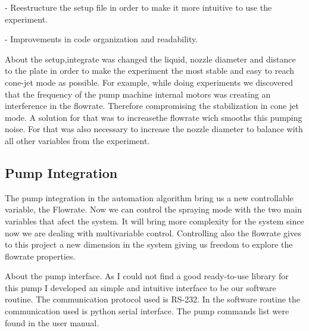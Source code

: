 - Reestructure the setup file in order to make it more intuitive to use the experiment.

- Improvements in code organization and readability.

About the setup,integrate was changed the liquid, nozzle diameter and distance to the plate in order to
make the experiment the most stable and easy to reach cone-jet mode as possible. For example, while doing experiments we discovered that the frequency of the pump machine internal motors was creating an interference in the flowrate. Therefore compromising the stabilization in cone jet mode. A solution for that was to increasethe flowrate wich smooths this pumping noise. For that was also necessary to increase the nozzle diameter to balance with all other variables from the experiment.

\subsection{Pump Integration}

    The pump integration in the automation algorithm bring us a new controllable variable, the Flowrate. Now we can control the spraying mode with the
    two main variables that afect the system. 
    It will bring more complexity for the system since now we are dealing with multivariable control.
    Controlling also the flowrate gives to this project a new dimension in the system giving us freedom to explore the flowrate properties.

    About the pump interface. As I could not find a good ready-to-use library for this pump I developed an simple and intuitive interface to be our software routine.
    The communication protocol used is RS-232. In the software routine the communication used is python serial interface. The pump commands list were found in the user manual.



\clearpage